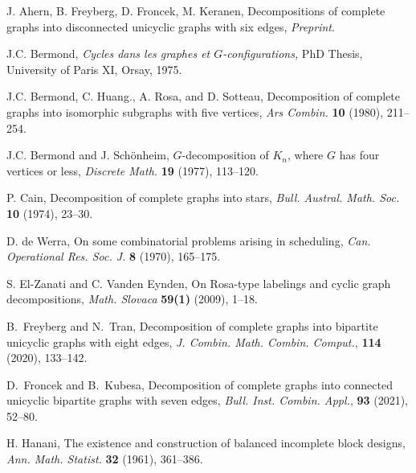 \documentclass{article}
\theoremstyle{plain}
\theoremstyle{definition}
\theoremstyle{plain}
\theoremstyle{plain}
\theoremstyle{plain}
\begin{document}
 
\newpage
 \begin{thebibliography}{10}
 
 J. Ahern, B. Freyberg, D. Froncek, M. Keranen, Decompositions of complete graphs into disconnected unicyclic graphs with six edges, \emph{Preprint}.
 
 J.C. Bermond, 
 \emph{Cycles dans les graphes et $G$-configurations,}
 PhD Thesis, University of Paris XI,
 Orsay, 1975.
 
 J.C. Bermond, C. Huang., A. Rosa, and D. Sotteau, 
 Decomposition of complete graphs into isomorphic subgraphs with five vertices, 
 \emph{Ars Combin.} 
 \textbf{10} (1980), 211--254.
 
 J.C. Bermond and J. Sch\"onheim, 
 $G$-decomposition of $K_n$, where $G$ has four vertices or less,
 \emph{Discrete Math.} 
 \textbf{19} (1977), 113--120.
 
 P. Cain, 
 Decomposition of complete graphs into stars, 
 \emph{Bull. Austral. Math. Soc.} 
 \textbf{10} (1974), 23--30.
 
 D. de Werra, 
 On some combinatorial problems arising in scheduling, 
 \emph{Can. Operational Res. Soc. J.}
 \textbf{8} (1970), 165--175.
 
 S. El-Zanati and C. Vanden Eynden, 
 On Rosa-type labelings and cyclic
 graph decompositions, 
 \emph{Math. Slovaca} \textbf{59(1)} (2009), 1--18.
 
 B.~Freyberg and N.~Tran,
 {Decomposition of complete graphs into bipartite unicyclic graphs with eight edges},
 \emph{J. Combin. Math. Combin. Comput.},  \textbf{114} (2020), 133--142.
 
 D.~Fron{c}ek and B.~Kubesa,
 {Decomposition of complete graphs  into connected  unicyclic bipartite graphs with seven edges},
 \emph{Bull. Inst. Combin. Appl.},  \textbf{93} (2021), 52--80.
 
 
 H. Hanani, 
 The existence and construction of balanced incomplete block designs, 
 \emph{Ann. Math. Statist.} \textbf{32} (1961), 361--386.
 

\end{thebibliography}
\end{document}
